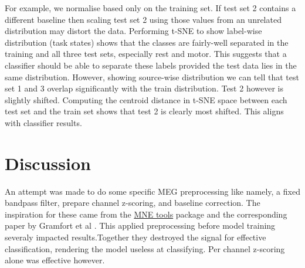 \documentclass[conference]{IEEEtran}
\begin{document}
For example, we normalise based only on the training set. If test set 2 contains a different baseline then scaling test set 2 using those values from an unrelated distribution may distort the data. Performing t-SNE to show label-wise distribution (task states) shows that the classes are fairly-well separated in the training and all three test sets, especially rest and motor. This suggests that a classifier should be able to separate these labels provided the test data lies in the same distribution. However, showing source-wise distribution we can tell that test set 1 and 3 overlap significantly with the train distribution. Test 2 however is slightly shifted. Computing the centroid distance in t-SNE space between each test set and the train set shows that test 2 is clearly most shifted. This aligns with classifier results. 

\section{Discussion}
An attempt was made to do some specific MEG preprocessing like namely, a fixed bandpass filter, prepare channel z-scoring, and baseline correction. The inspiration for these came from the \href{https://mne.tools/stable/index.html}{MNE tools} package and the corresponding paper by Gramfort et al \cite{gramfort2013meg}. This applied preprocessing before model training severaly impacted results.Together they destroyed the signal for effective classification, rendering the model useless at classifying. Per channel z-scoring alone was effective however. 
\end{document}

